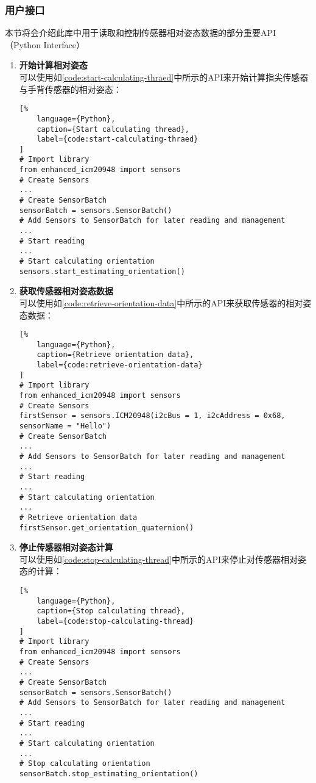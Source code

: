 \subsubsection{用户接口}
本节将会介绍此库中用于读取和控制传感器相对姿态数据的部分重要API（Python Interface）
\begin{enumerate}
    \item {\bfseries 开始计算相对姿态} \\
可以使用如\autoref{code:start-calculating-thraed}中所示的API来开始计算指尖传感器与手背传感器的相对姿态：
\begin{lstlisting}[%
    language={Python},
    caption={Start calculating thread},
    label={code:start-calculating-thraed}
]
# Import library
from enhanced_icm20948 import sensors
# Create Sensors
...
# Create SensorBatch
sensorBatch = sensors.SensorBatch()
# Add Sensors to SensorBatch for later reading and management
...
# Start reading
...
# Start calculating orientation
sensors.start_estimating_orientation()
\end{lstlisting}
    \item {\bfseries 获取传感器相对姿态数据} \\
可以使用如\autoref{code:retrieve-orientation-data}中所示的API来获取传感器的相对姿态数据：
\begin{lstlisting}[%
    language={Python},
    caption={Retrieve orientation data},
    label={code:retrieve-orientation-data}
]
# Import library
from enhanced_icm20948 import sensors
# Create Sensors
firstSensor = sensors.ICM20948(i2cBus = 1, i2cAddress = 0x68, sensorName = "Hello")
# Create SensorBatch
...
# Add Sensors to SensorBatch for later reading and management
...
# Start reading
...
# Start calculating orientation
...
# Retrieve orientation data
firstSensor.get_orientation_quaternion()
\end{lstlisting}
    \item {\bfseries 停止传感器相对姿态计算} \\
可以使用如\autoref{code:stop-calculating-thread}中所示的API来停止对传感器相对姿态的计算：
\begin{lstlisting}[%
    language={Python},
    caption={Stop calculating thread},
    label={code:stop-calculating-thread}
]
# Import library
from enhanced_icm20948 import sensors
# Create Sensors
...
# Create SensorBatch
sensorBatch = sensors.SensorBatch()
# Add Sensors to SensorBatch for later reading and management
...
# Start reading
...
# Start calculating orientation
...
# Stop calculating orientation
sensorBatch.stop_estimating_orientation()
\end{lstlisting}
\end{enumerate}

